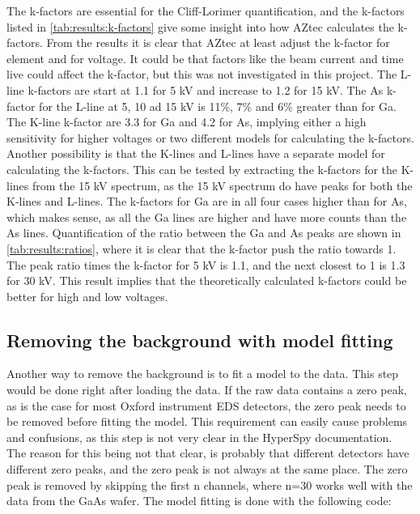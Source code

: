 The k-factors are essential for the Cliff-Lorimer quantification, and the k-factors listed in \cref{tab:results:k-factors} give some insight into how AZtec calculates the k-factors.
From the results it is clear that AZtec at least adjust the k-factor for element and for voltage.
It could be that factors like the beam current and time live could affect the k-factor, but this was not investigated in this project.
The L-line k-factors are start at 1.1 for 5 kV and increase to 1.2 for 15 kV.
The As k-factor for the L-line at 5, 10 ad 15 kV is 11\%, 7\% and 6\% greater than for Ga.
The K-line k-factor are 3.3 for Ga and 4.2 for As, implying either a high sensitivity for higher voltages or two different models for calculating the k-factors.
Another possibility is that the K-lines and L-lines have a separate model for calculating the k-factors.
This can be tested by extracting the k-factors for the K-lines from the 15 kV spectrum, as the 15 kV spectrum do have peaks for both the K-lines and L-lines.
The k-factors for Ga are in all four cases higher than for As, which makes sense, as all the Ga lines are higher and have more counts than the As lines.
Quantification of the ratio between the Ga and As peaks are shown in \cref{tab:results:ratios}, where it is clear that the k-factor push the ratio towards 1.
The peak ratio times the k-factor for 5 kV is 1.1, and the next closest to 1 is 1.3 for 30 kV.
This result implies that the theoretically calculated k-factors could be better for high and low voltages.








\subsection{Removing the background with model fitting}
\label{sec:discussion:steps:model_fitting}
Another way to remove the background is to fit a model to the data.
This step would be done right after loading the data.
If the raw data contains a zero peak, as is the case for most Oxford instrument EDS detectors, the zero peak needs to be removed before fitting the model.
This requirement can easily cause problems and confusions, as this step is not very clear in the HyperSpy documentation.
The reason for this being not that clear, is probably that different detectors have different zero peaks, and the zero peak is not always at the same place.
The zero peak is removed by skipping the first n channels, where n=30 works well with the data from the GaAs wafer.
The model fitting is done with the following code:

